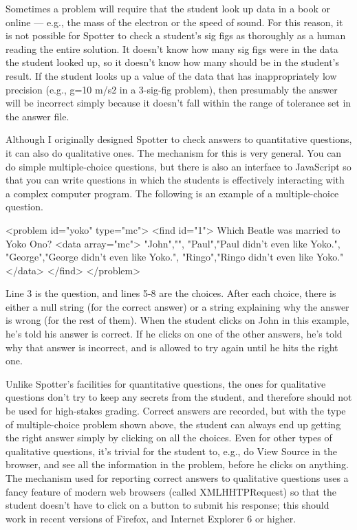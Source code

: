 \documentclass{doc}
\begin{document}
Sometimes a problem will require that the student look up data in a book or online --- e.g.,
the mass of the electron or the speed of sound. For this reason, it is not possible for
Spotter to check a student's sig figs as thoroughly as a human reading the entire solution.
It doesn't know how many sig figs were in the data the student looked up, so it doesn't
know how many should be in the student's result.
If the student looks up a value of the data that has inappropriately low precision
(e.g., g=10 m/s2 in a 3-sig-fig problem), then presumably the answer will be incorrect
simply because it doesn't fall within the range of tolerance set in the answer file.

\label{qualitative}
Although I originally designed Spotter to check answers to quantitative questions,
it can also do qualitative ones. The mechanism for this is very general. You can
do simple multiple-choice questions, but there is also an interface to JavaScript
so that you can write questions in which the students is effectively interacting
with a complex computer program. The following is an example of a multiple-choice
question.
\begin{listing}{1}
<problem id="yoko" type="mc">
  <find id="1">
    Which Beatle was married to Yoko Ono?
    <data array="mc">
      "John","",
      "Paul","Paul didn't even like Yoko.",
      "George","George didn't even like Yoko.",
      "Ringo","Ringo didn't even like Yoko."
    </data>
  </find>
</problem>
\end{listing}
Line 3 is the question, and lines 5-8 are the choices. After each choice,
there is either a null string (for the correct answer) or a string explaining
why the answer is wrong (for the rest of them). When the student clicks on
John in this example, he's told his answer is correct. If he clicks on one
of the other answers, he's told why that answer is incorrect, and is allowed
to try again until he hits the right one.

Unlike Spotter's facilities for
quantitative questions, the ones for qualitative questions don't try to keep
any secrets from the student, and therefore should not be used for high-stakes
grading. Correct answers are recorded, but with the type of multiple-choice
problem shown above, the student can always end up getting the right answer
simply by clicking on all the choices. Even for other types of qualitative
questions, it's trivial for the student to,
e.g., do View Source in the browser, and see all the information in
the problem, before
he clicks on anything. The mechanism used for reporting correct answers
to qualitative questions uses a fancy feature of modern web browsers (called
XMLHHTPRequest) so that the student doesn't have to click on a button
to submit his response; this should work in recent versions of Firefox,
and Internet Explorer 6 or higher.
\end{document}

